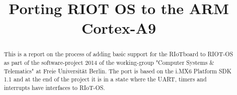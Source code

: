 \documentclass[conference,a4paper]{IEEEtran}
\begin{document}
\title{Porting RIOT OS to the ARM Cortex\texttrademark-A9}

\author{
}

\maketitle

\begin{abstract}
This is a report on the process of adding basic support for the RIoTboard to RIOT-OS as
part of the software-project 2014 of the working-group "Computer Systems \& Telematics"
at Freie Universität Berlin.
The port is based on the i.MX6 Platform SDK 1.1 and at the end of the project it is in a
state where the UART, timers and interrupts have interfaces to RIoT-OS.
\end{abstract}

\IEEEpeerreviewmaketitle








%
%
\end{document}
